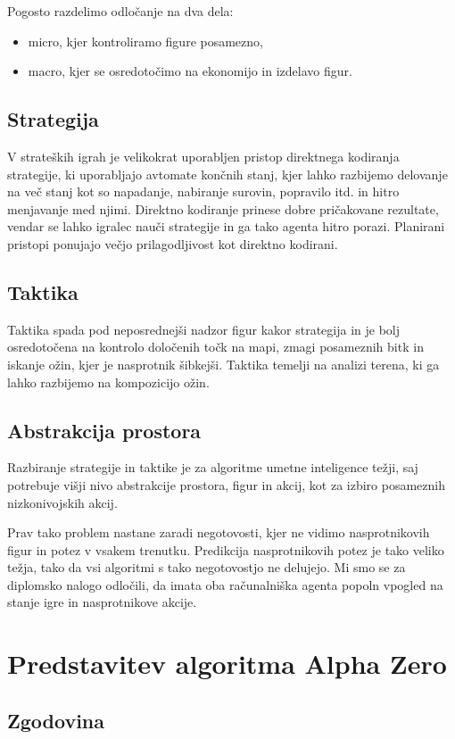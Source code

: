 \documentclass[a4paper, 12pt]{book}
\begin{document}
\begin{itemize}
	Pogosto razdelimo odločanje na dva dela:
	\begin{itemize}
		\item micro, kjer kontroliramo figure posamezno,
		\item macro, kjer se osredotočimo na ekonomijo in izdelavo figur.
	\end{itemize}
\end{itemize}

\section{Strategija}
V strateških igrah je velikokrat uporabljen pristop direktnega kodiranja strategije, ki uporabljajo avtomate končnih stanj, kjer lahko razbijemo delovanje na več stanj kot so napadanje, nabiranje surovin, popravilo itd. in hitro menjavanje med njimi. Direktno kodiranje prinese dobre pričakovane rezultate, vendar se lahko igralec nauči strategije in ga tako agenta hitro porazi.
Planirani pristopi ponujajo večjo prilagodljivost kot direktno kodirani.
\section{Taktika}
Taktika spada pod neposrednejši nadzor figur kakor strategija in je bolj osredotočena na kontrolo določenih točk na mapi, zmagi posameznih bitk in iskanje ožin, kjer je nasprotnik šibkejši. Taktika temelji na analizi terena, ki ga lahko razbijemo na kompozicijo ožin.

\section{Abstrakcija prostora}
Razbiranje strategije in taktike je za algoritme umetne inteligence težji, saj potrebuje višji nivo abstrakcije prostora, figur in akcij, kot za izbiro posameznih nizkonivojskih akcij.

Prav tako problem nastane zaradi negotovosti, kjer ne vidimo nasprotnikovih figur in potez v vsakem trenutku. Predikcija nasprotnikovih potez je tako veliko težja, tako da vsi algoritmi s tako negotovostjo ne delujejo.
Mi smo se za diplomsko nalogo odločili, da imata oba računalniška agenta popoln vpogled na stanje igre in nasprotnikove akcije.

\chapter{Predstavitev algoritma Alpha Zero}
\label{alphazero}
\section{Zgodovina}
\end{document}
